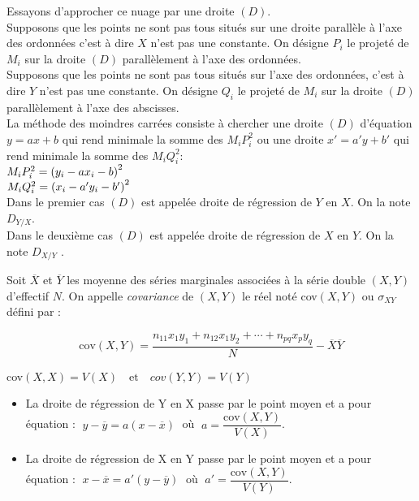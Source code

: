 Essayons d’approcher ce nuage par une droite
$ (D) $.\\
Supposons que les points ne sont pas tous situés
sur une droite parallèle à l’axe des ordonnées c’est
à dire $ X $ n’est pas une constante. On désigne $P_i$ le
projeté de $ M_i$ sur la droite $ (D) $ parallèlement à
l’axe des ordonnées.\\
Supposons que les points ne sont pas tous situés
sur l’axe des ordonnées, c’est à dire $Y$ n’est pas
une constante. On désigne $Q_i$ le projeté de $M_i$ sur
la droite $ (D) $ parallèlement à l’axe des abscisses.\\
La méthode des moindres carrées consiste à
chercher une droite $ (D) $ d’équation $ y= a x +b$ qui
rend minimale la somme des  $ M_{i}P_{i}^{2} $  ou une droite $ x'=a'y+b' $ qui
rend minimale la somme des  $ M_{i}Q_{i}^{2} $:\\
 $ M_{i}P_{i}^{2}=\left(y_{i}-ax_{i}-b\right)^{2} $ \\
 $ M_{i}Q_{i}^{2}=\left(x_{i}-a'y_{i}-b'\right)^{2} $ \\
 Dans le premier cas $(D)$ est appelée droite de
régression de $Y$ en $X$. On la note $D _{Y/X }$.\\
Dans le deuxième cas $(D)$ est appelée droite de
régression de $X$ en $Y$. On la note $ D _{X/Y}$ .

\begin{definition}

Soit $ \overline{X} $ et $ \overline{Y} $ les moyenne des séries
marginales associées à la série double $(X,Y)$
d’effectif $N$. On appelle \textit{covariance } de $(X,Y)$ le
réel noté cov$(X,Y)$ ou   $ \sigma _{XY} $ défini par : 

\[\text{cov}(X,Y)=\frac{n_{11}x_{1}y_{1}+n_{12}x_{1}y_{2}+\cdots+n_{pq}x_{p}y_{q}}{ N}  -\overline{X}\overline{Y}\]
\end{definition}

\begin{remark}
cov$ (X,X)=V(X)  \quad  \text{et} \quad cov (Y,Y)=V(Y) $
\end{remark}

\begin{theorem}
\begin{itemize}
\item La droite de régression de Y en X passe par le
point moyen et a pour équation : $\; y-\overline{y}=a(x-\overline{x})\;$ où  $\; a=\dfrac{\text{cov}(X,Y)}{V(X)} $.
\item La droite de régression de X en Y passe par le
point moyen et a pour équation : $\; x-\overline{x}=a'(y-\overline{y})\; $ où  $\; a'=\dfrac{\text{cov}(X,Y)}{V(Y)} $.
\end{itemize}

\end{theorem}


